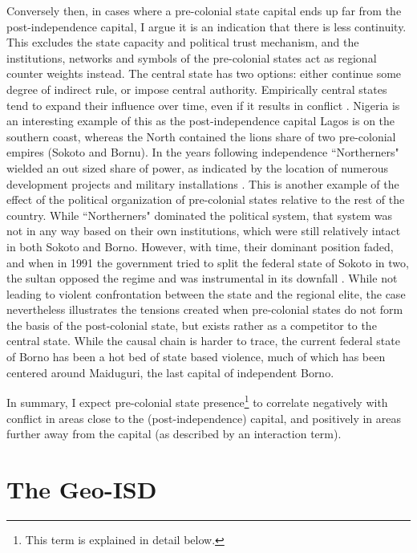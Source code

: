 \documentclass[12pt]{article}
\begin{document}
Conversely then, in cases where a pre-colonial state capital ends up far from
the post-independence capital, I argue it is an indication that there is less
continuity. This excludes the state capacity and political trust mechanism, and
the institutions, networks and symbols of the pre-colonial states act as
regional counter weights instead. The central state has two options: either
continue some degree of indirect rule, or impose central authority. Empirically
central states tend to expand their influence over time, even if it results in
conflict \citep{Ying_2020}. Nigeria is an interesting example of this as the
post-independence capital Lagos is on the southern coast, whereas the North
contained the lions share of two pre-colonial empires (Sokoto and
Bornu). In the years following independence ``Northerners" wielded an out sized
share of power, as indicated by the location of numerous development projects
and military installations \citep{Bates2008a}. This is another example of the
effect of the political organization of pre-colonial states relative to the rest
of the country. While ``Northerners" dominated the political system, that system
was not in any way based on their own institutions, which were still relatively
intact in both Sokoto and Borno. However, with time, their dominant position
faded, and when in 1991 the government tried to split the federal state of
Sokoto in two, the sultan opposed the regime and was instrumental in its
downfall \citep{HiribarrenVincent2017AHoB}. While not leading to violent
confrontation between the state and the regional elite, the case nevertheless
illustrates the tensions created when pre-colonial states do not form the basis
of the post-colonial state, but exists rather as a competitor to the central
state. While the causal chain is harder to trace, the current federal state of
Borno has been a hot bed of state based violence, much of which has been
centered around Maiduguri, the last capital of independent Borno.

In summary, I expect pre-colonial state presence\footnote{This term is explained
in detail below.} to correlate negatively with conflict in areas close to the
(post-independence) capital, and positively in areas further away from the
capital (as described by an interaction term).

\section{The Geo-ISD}
\end{document}
